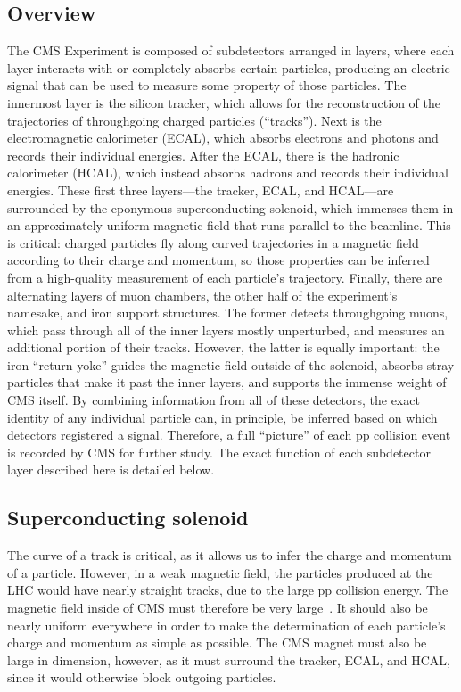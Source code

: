 \subsection{Overview}
The CMS Experiment is composed of subdetectors arranged in layers, where each layer interacts with or completely absorbs certain particles, producing an electric signal that can be used to measure some property of those particles. 
The innermost layer is the silicon tracker, which allows for the reconstruction of the trajectories of throughgoing charged particles (``tracks''). 
Next is the electromagnetic calorimeter (ECAL), which absorbs electrons and photons and records their individual energies. 
After the ECAL, there is the hadronic calorimeter (HCAL), which instead absorbs hadrons and records their individual energies. 
These first three layers---the tracker, ECAL, and HCAL---are surrounded by the eponymous superconducting solenoid, which immerses them in an approximately uniform magnetic field that runs parallel to the beamline. 
This is critical: charged particles fly along curved trajectories in a magnetic field according to their charge and momentum, so those properties can be inferred from a high-quality measurement of each particle's trajectory. 
Finally, there are alternating layers of muon chambers, the other half of the experiment's namesake, and iron support structures. 
The former detects throughgoing muons, which pass through all of the inner layers mostly unperturbed, and measures an additional portion of their tracks.
However, the latter is equally important: the iron ``return yoke'' guides the magnetic field outside of the solenoid, absorbs stray particles that make it past the inner layers, and supports the immense weight of CMS itself. 
By combining information from all of these detectors, the exact identity of any individual particle can, in principle, be inferred based on which detectors registered a signal. 
Therefore, a full ``picture'' of each pp collision event is recorded by CMS for further study. 
The exact function of each subdetector layer described here is detailed below.

\subsection{Superconducting solenoid}
The curve of a track is critical, as it allows us to infer the charge and momentum of a particle. 
However, in a weak magnetic field, the particles produced at the LHC would have nearly straight tracks, due to the large pp collision energy. 
The magnetic field inside of CMS must therefore be very large~\cite{CMSWebMagnet}. 
It should also be nearly uniform everywhere in order to make the determination of each particle's charge and momentum as simple as possible. 
The CMS magnet must also be large in dimension, however, as it must surround the tracker, ECAL, and HCAL, since it would otherwise block outgoing particles. 


